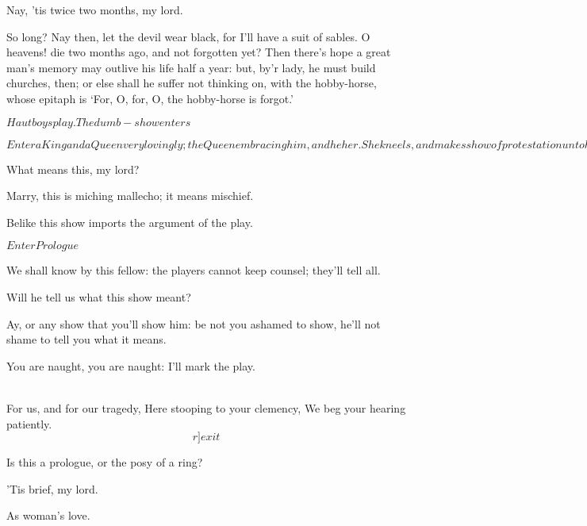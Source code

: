 \documentclass[11pt]{book}
\begin{document}
\4	Nay, 'tis twice two months, my lord.

\1	So long? Nay then, let the devil wear black, for
	I'll have a suit of sables. O heavens! die two
	months ago, and not forgotten yet? Then there's
	hope a great man's memory may outlive his life half
	a year: but, by'r lady, he must build churches,
	then; or else shall he suffer not thinking on, with
	the hobby-horse, whose epitaph is `For, O, for, O,
	the hobby-horse is forgot.'

	\(Hautboys play. The dumb-show enters\)

	\(Enter a King and a Queen very lovingly; the Queen
	embracing him, and he her. She kneels, and makes
	show of protestation unto him. He takes her up,
	and declines his head upon her neck: lays him down
	upon a bank of flowers: she, seeing him asleep,
	leaves him. Anon comes in a fellow, takes off his
	crown, kisses it, and pours poison in the King's
	ears, and exit. The Queen returns; finds the King
	dead, and makes passionate action. The Poisoner,
	with some two or three Mutes, comes in again,
	seeming to lament with her. The dead body is
	carried away. The Poisoner wooes the Queen with
	gifts: she seems loath and unwilling awhile, but
	in the end accepts his love\)

\4	What means this, my lord?

\1	Marry, this is miching mallecho; it means mischief.

\4	Belike this show imports the argument of the play.

	\(Enter Prologue\)

\1	We shall know by this fellow: the players cannot
	keep counsel; they'll tell all.

\4	Will he tell us what this show meant?

\1	Ay, or any show that you'll show him: be not you
	ashamed to show, he'll not shame to tell you what it means.

\4	You are naught, you are naught: I'll mark the play.

\begin{versus}
 \\
   \Locus \textus {+6em}
   For us, and for our tragedy,
	Here stooping to your clemency,
	We beg your hearing patiently. \[r]exit\]  
\end{versus}

\1	Is this a prologue, or the posy of a ring?

\4	'Tis brief, my lord.

\1	As woman's love.
\end{document}
